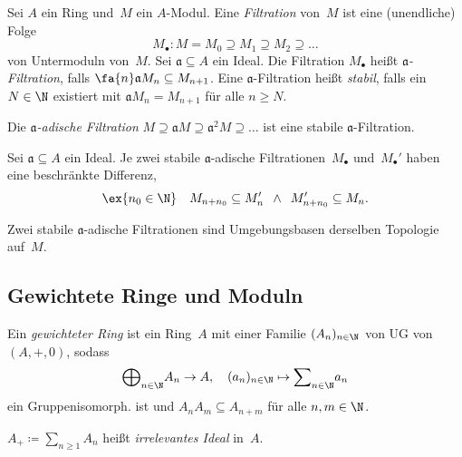 \documentclass{cheat-sheet}
\newcommand{\aaa}{\mathfrak{a}}
\begin{document}


\begin{defn}
  Sei $A$ ein Ring und~$M$ ein $A$-Modul.
  Eine \emph{Filtration} von~$M$ ist eine (unendliche) Folge
  \[
    M_\bullet : M = M_0 \supseteq M_1 \supseteq M_2 \supseteq \ldots
  \]
  von Untermoduln von~$M$.
  Sei $\aaa \subseteq A$ ein Ideal.
  Die Filtration $M_\bullet$ heißt \emph{$\aaa$-Filtration}, falls $\fa{n} \aaa M_n \subseteq M_{n+1}$.
  Eine $\aaa$-Filtration heißt \emph{stabil}, falls ein $N \in \N$ existiert mit $\aaa M_n = M_{n+1}$ für alle $n \geq N$.
\end{defn}

\begin{bsp}
  Die \emph{$\aaa$-adische Filtration} $M \supseteq \aaa M \supseteq \aaa^2 M \supseteq \ldots$ ist eine stabile $\aaa$-Filtration.
\end{bsp}

\begin{lem}
  Sei $\aaa \subseteq A$ ein Ideal.
  Je zwei stabile $\aaa$-adische Filtrationen~$M_\bullet$ und~$M_\bullet'$ haben eine beschränkte Differenz, \dh{}
  \[
    \ex{n_0 \in \N} \quad
    M_{n + n_0} \subseteq M'_n
    \enspace\wedge\enspace
    M'_{n + n_0} \subseteq M_n.
  \]
\end{lem}

\begin{kor}
  Zwei stabile $\aaa$-adische Filtrationen sind Umgebungsbasen derselben Topologie auf~$M$.
\end{kor}

\subsection{Gewichtete Ringe und Moduln}


\begin{defn}
  Ein \emph{gewichteter Ring} ist ein Ring~$A$ mit einer Familie $(A_n)_{n \in \N}$ von UG von $(A, +, 0)$, sodass
  \[
    {\bigoplus}_{n \in \N} A_n \to A, \quad
    (a_n)_{n \in \N} \mapsto {\sum}_{n \in \N} a_n
  \]
  ein Gruppenisomorph. ist und $A_n A_m \subseteq A_{n+m}$ für alle $n, m \in \N$.
\end{defn}

\begin{defn}
  $A_+ \coloneqq {\sum}_{n \geq 1} A_n$ heißt \emph{irrelevantes Ideal} in~$A$.
\end{defn}
\end{document}
